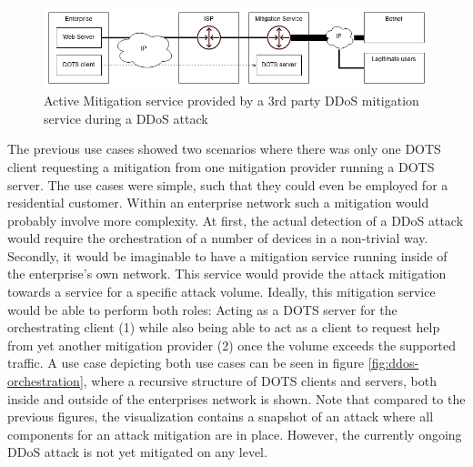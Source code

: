 \begin{figure}
    \centering
    \includegraphics[width=16cm]{Seminar-Template/Talk7/images/3rdparty-DMS.png}
    \caption{Active Mitigation service provided by a 3rd party DDoS mitigation service during a DDoS attack}
    \label{fig:3rdparty-mitigation}
\end{figure}{}

The previous use cases showed two scenarios where there was only one DOTS client requesting a mitigation from one mitigation provider running a DOTS server. The use cases were simple, such that they could even be employed for a residential customer. Within an enterprise network such a mitigation would probably involve more complexity. At first, the actual detection of a DDoS attack would require the orchestration of a number of devices in a non-trivial way. Secondly, it would be imaginable to have a mitigation service running inside of the enterprise's own network. This service would provide the attack mitigation towards a service for a specific attack volume. Ideally, this mitigation service would be able to perform both roles: Acting as a DOTS server for the orchestrating client (1) while also being able to act as a client to request help from yet another mitigation provider (2) once the volume exceeds the supported traffic. A use case depicting both use cases can be seen in figure \ref{fig:ddos-orchestration}, where a recursive structure of DOTS clients and servers, both inside and outside of the enterprises network is shown. Note that compared to the previous figures, the visualization contains a snapshot of an attack where all components for an attack mitigation are in place. However, the currently ongoing DDoS attack is not yet mitigated on any level.

